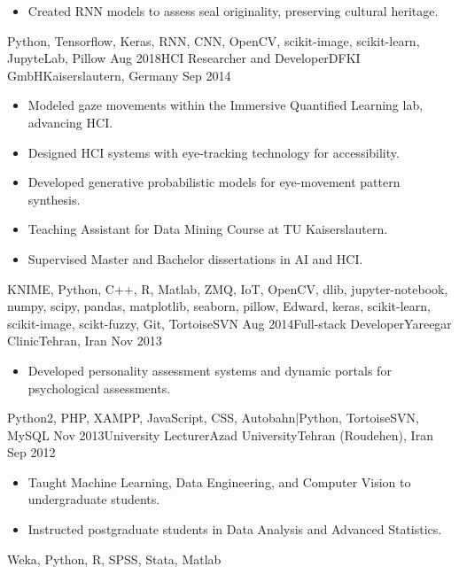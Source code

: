 \begin{experiences}
{\begin{itemize}
			\item Created RNN models to assess seal originality, preserving cultural heritage.
			

		\end{itemize}
	}
	{Python, Tensorflow, Keras, RNN, CNN, OpenCV, scikit-image, scikit-learn, JupyteLab, Pillow}
	\emptySeparator
	\experience
	{Aug 2018}{HCI Researcher and Developer}{DFKI GmbH}{Kaiserslautern, Germany}
	{Sep 2014} {
		\begin{itemize}
			\item Modeled gaze movements within the Immersive Quantified Learning lab, advancing HCI.
			
			\item Designed HCI systems with eye-tracking technology for accessibility.
			
			\item Developed generative probabilistic models for eye-movement pattern synthesis.
			
			\item Teaching Assistant for Data Mining Course at TU Kaiserslautern.
			
			\item Supervised Master and Bachelor dissertations in AI and HCI.
			

		\end{itemize}
	}
	{KNIME, Python, C++, R, Matlab, ZMQ, IoT, OpenCV, dlib, jupyter-notebook, numpy, scipy, pandas, matplotlib, seaborn, pillow, Edward, keras, scikit-learn, scikit-image, scikt-fuzzy, Git, TortoiseSVN}
	\emptySeparator
	\experience
	{Aug 2014}{Full-stack Developer}{Yareegar Clinic}{Tehran, Iran}
	{Nov 2013} {
		\begin{itemize}
			\item Developed personality assessment systems and dynamic portals for psychological assessments.
			
		\end{itemize}
	}
	{Python2, PHP, XAMPP, JavaScript, CSS, Autobahn|Python, TortoiseSVN, MySQL}
	\emptySeparator
	\experience
	{Nov 2013}{University Lecturer}{Azad University}{Tehran (Roudehen), Iran}
	{Sep 2012} {
		\begin{itemize}
			\item Taught Machine Learning, Data Engineering, and Computer Vision to undergraduate students.

			\item Instructed postgraduate students in Data Analysis and Advanced Statistics.
			

		\end{itemize}
	}
	{Weka, Python, R, SPSS, Stata, Matlab}
\end{experiences}

